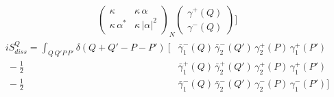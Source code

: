 \documentclass[a4paper,11pt, english]{article}
\theoremstyle{remark}
\begin{document}
\begin{subequations}
\begin{align}
	       \begin{pmatrix}\kappa & \kappa\,\alpha \\ \kappa\,\alpha^* & \kappa\,|\alpha|^2 \end{pmatrix}_{\!\!N}
	       \begin{pmatrix}\gamma^+(Q)\\ \gamma^-(Q)\end{pmatrix} \Bigg]   
	       \end{align} \end{subequations} 
	\begin{equation}   
\begin{aligned}
 iS^Q_{diss}=\int_{Q\,Q'P\,P'}\!\!\!\delta(Q+Q'-P-P')\ \bigg[&\bar{\gamma}_{1}^-(Q)\,\bar{\gamma}_{2}^-(Q')\,\gamma_{2}^+(P)\,\gamma_{1}^+(P')\\
  \ -\frac{1}{2} &\bar{\gamma}_{1}^+(Q)\,\bar{\gamma}_{2}^+(Q')\,\gamma_{2}^+(P)\,\gamma_{1}^+(P')\\
  \ -\frac{1}{2} &\bar{\gamma}_{1}^-(Q)\,\bar{\gamma}_{2}^-(Q')\,\gamma_{2}^-(P)\,\gamma_{1}^-(P') \bigg]
\end{aligned} \label{eq:mHS_QuarticModelKeldyshAction}
\end{equation}
\end{document}
